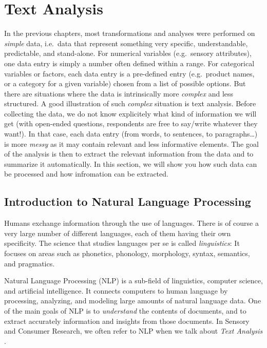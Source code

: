 \documentclass[
]{krantz}
\renewenvironment{quote}{\begin{VF}}{\end{VF}}
\begin{document}
\hypertarget{text-analysis}{%
\chapter{Text Analysis}\label{text-analysis}}

\begin{quote}
In the previous chapters, most transformations and analyses were performed on \emph{simple} data, i.e.~data that represent something very specific, understandable, predictable, and stand-alone. For numerical variables (e.g.~sensory attributes), one data entry is simply a number often defined within a range. For categorical variables or factors, each data entry is a pre-defined entry (e.g.~product names, or a category for a given variable) chosen from a list of possible options. But there are situations where the data is intrinsically more \emph{complex} and less structured.
A good illustration of such \emph{complex} situation is text analysis. Before collecting the data, we do not know explicitely what kind of information we will get (with open-ended questions, respondents are free to say/write whatever they want!). In that case, each data entry (from words, to sentences, to paragraphs\ldots) is more \emph{messy} as it may contain relevant and less informative elements. The goal of the analysis is then to extract the relevant information from the data and to summarize it automatically. In this section, we will show you how such data can be processed and how infromation can be extracted.
\end{quote}

\hypertarget{introduction-to-natural-language-processing}{%
\section{Introduction to Natural Language Processing}\label{introduction-to-natural-language-processing}}

Humans exchange information through the use of languages. There is of course a very large number of different languages, each of them having their own specificity. The science that studies languages per se is called \emph{linguistics}: It focuses on areas such as phonetics, phonology, morphology, syntax, semantics, and pragmatics.

Natural Language Processing (NLP) is a sub-field of linguistics, computer science, and artificial intelligence. It connects computers to human language by processing, analyzing, and modeling large amounts of natural language data. One of the main goals of NLP is to \emph{understand} the contents of documents, and to extract accurately information and insights from those documents. In Sensory and Consumer Research, we often refer to NLP when we talk about \emph{Text Analysis} .
\end{document}
